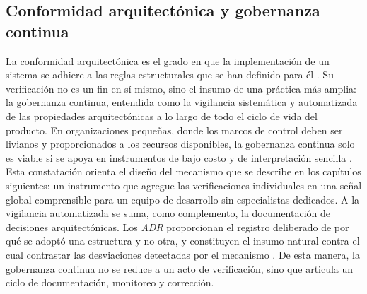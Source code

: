 \subsection{Conformidad arquitectónica y gobernanza continua}
La conformidad arquitectónica es el grado en que la implementación de un sistema se adhiere a las reglas estructurales que se han definido para él \citep{KnodelPopescu2007, Klein2022}. Su verificación no es un fin en sí mismo, sino el insumo de una práctica más amplia: la gobernanza continua, entendida como la vigilancia sistemática y automatizada de las propiedades arquitectónicas a lo largo de todo el ciclo de vida del producto. En organizaciones pequeñas, donde los marcos de control deben ser livianos y proporcionados a los recursos disponibles, la gobernanza continua solo es viable si se apoya en instrumentos de bajo costo y de interpretación sencilla \citep{LAIG2025}. Esta constatación orienta el diseño del mecanismo que se describe en los capítulos siguientes: un instrumento que agregue las verificaciones individuales en una señal global comprensible para un equipo de desarrollo sin especialistas dedicados. A la vigilancia automatizada se suma, como complemento, la documentación de decisiones arquitectónicas. Los \textit{ADR} proporcionan el registro deliberado de por qué se adoptó una estructura y no otra, y constituyen el insumo natural contra el cual contrastar las desviaciones detectadas por el mecanismo \citep{ADR}. De esta manera, la gobernanza continua no se reduce a un acto de verificación, sino que articula un ciclo de documentación, monitoreo y corrección.

